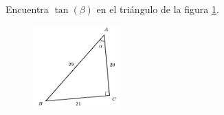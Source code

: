 \question[15] Encuentra $\tan(\beta)$ en el triángulo de la figura \ref{fig:functrig18}.
\begin{figure}[H]
    \begin{center}
        \includegraphics[width=0.3\textwidth]{../images/functrig18.png}
    \end{center}
    \caption{}
    \label{fig:functrig18}
\end{figure}
